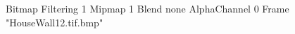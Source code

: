 {Bitmap
	{Filtering 1}
	{Mipmap 1}
	{Blend none}
	{AlphaChannel 0}
	{Frame "HouseWall12.tif.bmp"}
}
